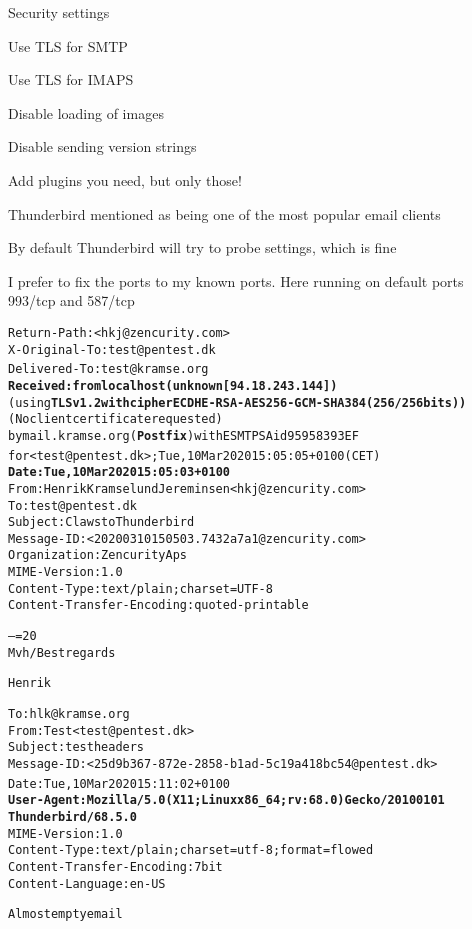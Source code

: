 \documentclass[Screen16to9,17pt]{foils}
\begin{document}


\begin{list2}
\item Security settings
\item Use TLS for SMTP
\item Use TLS for IMAPS
\item Disable loading of images
\item Disable sending version strings
\item Add plugins you need, but only those!
\end{list2}

Thunderbird mentioned as being one of the most popular email clients



By default Thunderbird will try to probe settings, which is fine



I prefer to fix the ports to my known ports. Here running on default ports 993/tcp and 587/tcp


\begin{alltt}\footnotesize
Return-Path: <hkj@zencurity.com>
X-Original-To: test@pentest.dk
Delivered-To: test@kramse.org{\bf
Received: from localhost (unknown [94.18.243.144])}
	(using {\bf TLSv1.2 with cipher ECDHE-RSA-AES256-GCM-SHA384 (256/256 bits))}
	(No client certificate requested)
	by mail.kramse.org ({\bf Postfix}) with ESMTPSA id 95958393EF
	for <test@pentest.dk>; Tue, 10 Mar 2020 15:05:05 +0100 (CET){\bf
Date: Tue, 10 Mar 2020 15:05:03 +0100}
From: Henrik Kramselund Jereminsen <hkj@zencurity.com>
To: test@pentest.dk
Subject: Claws to Thunderbird
Message-ID: <20200310150503.7432a7a1@zencurity.com>
Organization: Zencurity Aps
MIME-Version: 1.0
Content-Type: text/plain; charset=UTF-8
Content-Transfer-Encoding: quoted-printable

--=20
Mvh/Best regards

Henrik
\end{alltt}


\begin{alltt}\footnotesize
To: hlk@kramse.org
From: Test <test@pentest.dk>
Subject: test headers
Message-ID: <25d9b367-872e-2858-b1ad-5c19a418bc54@pentest.dk>
Date: Tue, 10 Mar 2020 15:11:02 +0100{\bf
User-Agent: Mozilla/5.0 (X11; Linux x86_64; rv:68.0) Gecko/20100101
 Thunderbird/68.5.0}
MIME-Version: 1.0
Content-Type: text/plain; charset=utf-8; format=flowed
Content-Transfer-Encoding: 7bit
Content-Language: en-US

Almost empty email
\end{alltt}
\end{document}
